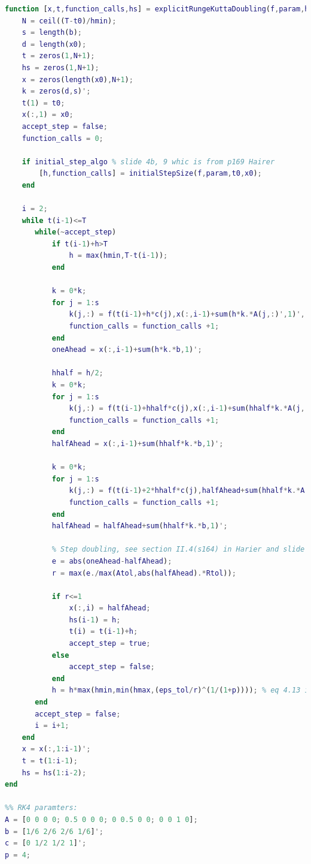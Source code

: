 \begin{lstlisting}[language=Matlab,caption=Implementation of explicit Runge-Kutta solver with adaptive time step. Parameters corresponding to RK4 given at the end,label=lst5:rk4_adap]
function [x,t,function_calls,hs] = explicitRungeKuttaDoubling(f,param,h,t0,T,x0,A,b,c,Atol,Rtol,hmin,hmax,eps_tol,p,initial_step_algo)
    N = ceil((T-t0)/hmin);
    s = length(b);
    d = length(x0);
    t = zeros(1,N+1);
    hs = zeros(1,N+1);
    x = zeros(length(x0),N+1);
    k = zeros(d,s)';
    t(1) = t0;
    x(:,1) = x0;
    accept_step = false;
    function_calls = 0;
    
    if initial_step_algo % slide 4b, 9 whic is from p169 Hairer
        [h,function_calls] = initialStepSize(f,param,t0,x0);
    end
    
    i = 2;
    while t(i-1)<=T
       while(~accept_step)
           if t(i-1)+h>T
               h = max(hmin,T-t(i-1));
           end
           
           k = 0*k;
           for j = 1:s
               k(j,:) = f(t(i-1)+h*c(j),x(:,i-1)+sum(h*k.*A(j,:)',1)', param);
               function_calls = function_calls +1;
           end
           oneAhead = x(:,i-1)+sum(h*k.*b,1)';

           hhalf = h/2;
           k = 0*k;
           for j = 1:s
               k(j,:) = f(t(i-1)+hhalf*c(j),x(:,i-1)+sum(hhalf*k.*A(j,:)',1)', param);
               function_calls = function_calls +1;
           end
           halfAhead = x(:,i-1)+sum(hhalf*k.*b,1)';

           k = 0*k;
           for j = 1:s
               k(j,:) = f(t(i-1)+2*hhalf*c(j),halfAhead+sum(hhalf*k.*A(j,:)',1)', param);
               function_calls = function_calls +1;
           end
           halfAhead = halfAhead+sum(hhalf*k.*b,1)';
           
           % Step doubling, see section II.4(s164) in Harier and slide 4c,3
           e = abs(oneAhead-halfAhead);
           r = max(e./max(Atol,abs(halfAhead).*Rtol));
           
           if r<=1
               x(:,i) = halfAhead;
               hs(i-1) = h;
               t(i) = t(i-1)+h;
               accept_step = true;
           else
               accept_step = false;
           end
           h = h*max(hmin,min(hmax,(eps_tol/r)^(1/(1+p)))); % eq 4.13 in Harier
       end
       accept_step = false;
       i = i+1;
    end
    x = x(:,1:i-1)';
    t = t(1:i-1);
    hs = hs(1:i-2);
end

%% RK4 paramters:
A = [0 0 0 0; 0.5 0 0 0; 0 0.5 0 0; 0 0 1 0];
b = [1/6 2/6 2/6 1/6]';
c = [0 1/2 1/2 1]';
p = 4;
\end{lstlisting}


